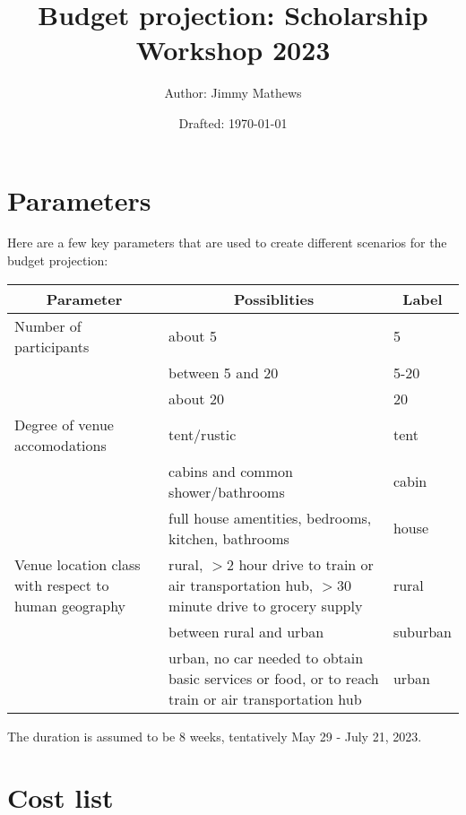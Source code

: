 \documentclass[10pt]{article}
\title{Budget projection: Scholarship Workshop 2023}
\author{Author: Jimmy Mathews}
\date{Drafted: \today}
\begin{document}
\maketitle

\section*{Parameters}
Here are a few key parameters that are used to create different scenarios for the budget projection:

\renewcommand{\arraystretch}{1.8}
\begin{center}
\begin{tabular}{p{5.2cm}|p{8.5cm}|p{1.5cm}}
\multicolumn{1}{c|}{Parameter} & \multicolumn{1}{|c|}{Possiblities} & \multicolumn{1}{|c}{Label}\\ \hline
Number of participants & about 5 & 5 \\
 & between 5 and 20 & 5-20 \\
 & about 20 & 20 \\ \hline
Degree of venue accomodations & tent/rustic & tent \\
& cabins and common shower/bathrooms & cabin \\
& full house amentities, bedrooms, kitchen, bathrooms & house \\ \hline
Venue location class with respect to human geography & rural, $>$2 hour drive to train or air transportation hub, $>$30 minute drive to grocery supply & rural \\
 & between rural and urban  & suburban \\
 & urban, no car needed to obtain basic services or food, or to reach train or air transportation hub & urban \\
\end{tabular}
\end{center}
\renewcommand{\arraystretch}{1.0}

The duration is assumed to be 8 weeks, tentatively May 29 - July 21, 2023.

\section*{Cost list}

\newcommand{\costlabel}[1]{\refstepcounter{costexplanation}\label{#1}\textsuperscript{\thecostexplanation}}
\end{document}
